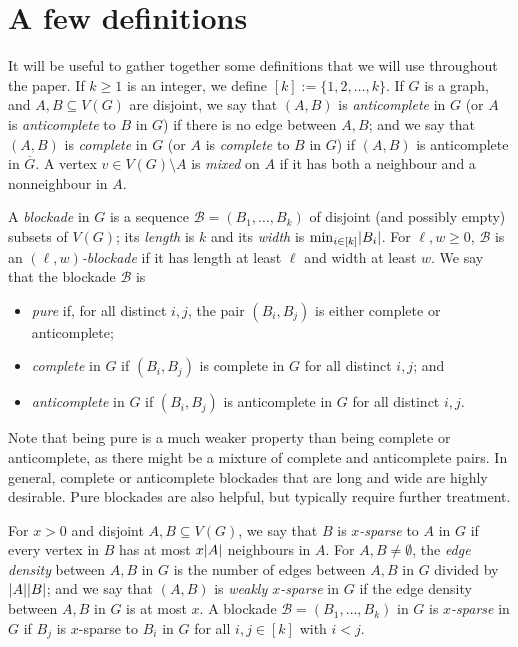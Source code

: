 \documentclass[11pt,reqno,a4paper]{amsart}
\newcommand{\mac}{\mathcal}
\renewcommand{\subset}{\subseteq}
\DeclarePairedDelimiter\abs{\lvert}{\rvert}%
\begin{document}
	
	
	\section{A few definitions}
	\label{sec:defs}
	
	It will be useful to gather together some definitions that we will use throughout the paper.
	If $k\ge 1$ is an integer, we define $[k]:=\{1,2,\ldots,k\}$.
	If $G$ is a graph, and $A,B\subset V(G)$ are disjoint, we say that $(A,B)$ is {\em anticomplete} in $G$ (or $A$ is {\em 
		anticomplete} to $B$ in $G$) if there is no edge between $A,B$;
	and we  say that $(A,B)$ is {\em complete} in $G$ (or $A$ is {\em complete} to $B$ in $G$) if $(A,B)$ is anticomplete in $\overline G$.
	A vertex $v\in V(G)\setminus A$ is {\em mixed} on $A$ if it has both a neighbour and a nonneighbour in $A$.
	
	
	A {\em blockade} in $G$ is a sequence $\mac B=(B_1,\ldots,B_k)$ of disjoint (and possibly empty) subsets of $V(G)$; its {\em length} is $k$ and its {\em width} is $\min_{i\in[k]}\abs{B_i}$.
	For $\ell,w\ge0$, $\mac B$ is an {\em $(\ell,w)$-blockade} if it has length at least $\ell$ and width at least $w$.
	We say that the blockade $\mac B$ is 
	\begin{itemize}
		\item  {\em pure} if, for all distinct $i, j$, the pair $(B_i,B_j)$ is either complete or anticomplete;
		\item  {\em complete} in $G$ if $(B_i,B_j)$ is complete in $G$ for all distinct $i,j$; and 
		\item {\em anticomplete} in $G$ if $(B_i,B_j)$ is anticomplete in $G$ for all distinct $i,j$.
	\end{itemize}
	Note that being pure is a much weaker property than being complete or anticomplete, as there might be a mixture of complete and anticomplete pairs.
	In general, complete or anticomplete blockades that are long and wide are highly desirable.  Pure blockades are also helpful, but typically require further treatment. 
	
	For $x>0$ and disjoint $A,B\subset V(G)$, we say that $B$ is {\em $x$-sparse} to $A$ in $G$ if every vertex in $B$ has at most $x\abs A$ neighbours in $A$.
	For $A,B\ne\emptyset$, the {\em edge density} between $A,B$ in $G$ is the number of edges between $A,B$ in $G$ divided by $\abs A\abs B$;
	and we say that $(A,B)$ is {\em weakly $x$-sparse} in $G$ if the edge density between $A,B$ in $G$ is at most $x$.
	A blockade $\mac B=(B_1,\ldots,B_k)$ in $G$ is {\em $x$-sparse} in $G$ if $B_j$ is $x$-sparse to $B_i$ in $G$ for all $i,j\in[k]$ with $i<j$.
	
\end{document}

